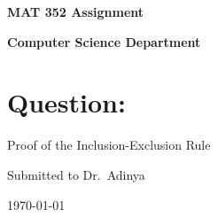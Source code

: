 \documentclass[a4paper]{article}
\begin{document}
    \begin{titlepage}

        \begin{center}
            \vspace*{1cm}

            \Huge
            \textbf{MAT 352 Assignment}

            \vspace{1.5cm}

            \textbf{Computer Science Department}

            \vspace{2cm}
            \normalsize
            \raggedright{
                \section*{Question:}
                Proof of the Inclusion-Exclusion Rule
            }

            \vspace{5cm}
            \centering
            Submitted to Dr.\ Adinya

            \vspace{1cm}
            \today
        \end{center}

    \end{titlepage}

	\pagestyle{fancy}
	\fancyhead{}
\end{document}
